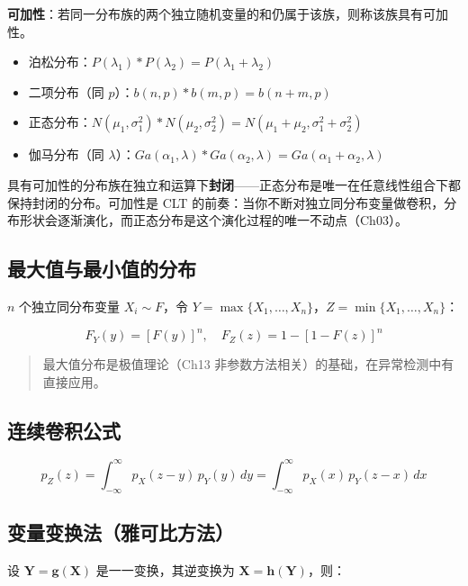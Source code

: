 \documentclass[
]{book}
\providecommand{\tightlist}{%
  \setlength{\itemsep}{0pt}\setlength{\parskip}{0pt}}
\begin{document}
\textbf{可加性}：若同一分布族的两个独立随机变量的和仍属于该族，则称该族具有可加性。

\begin{itemize}
\tightlist
\item
  泊松分布：\(P(\lambda_1) * P(\lambda_2) = P(\lambda_1 + \lambda_2)\)
\item
  二项分布（同 \(p\)）：\(b(n,p) * b(m,p) = b(n+m,p)\)
\item
  正态分布：\(N(\mu_1,\sigma_1^2) * N(\mu_2,\sigma_2^2) = N(\mu_1+\mu_2, \sigma_1^2+\sigma_2^2)\)
\item
  伽马分布（同 \(\lambda\)）：\(Ga(\alpha_1, \lambda) * Ga(\alpha_2, \lambda) = Ga(\alpha_1+\alpha_2, \lambda)\)
\end{itemize}

具有可加性的分布族在独立和运算下\textbf{封闭}------正态分布是唯一在任意线性组合下都保持封闭的分布。可加性是 CLT 的前奏：当你不断对独立同分布变量做卷积，分布形状会逐渐演化，而正态分布是这个演化过程的唯一不动点（Ch03）。

\subsection{最大值与最小值的分布}\label{ux6700ux5927ux503cux4e0eux6700ux5c0fux503cux7684ux5206ux5e03}

\(n\) 个独立同分布变量 \(X_i \sim F\)，令 \(Y = \max\{X_1, \ldots, X_n\}\)，\(Z = \min\{X_1, \ldots, X_n\}\)：

\[F_Y(y) = [F(y)]^n, \quad F_Z(z) = 1 - [1 - F(z)]^n\]

\begin{quote}
最大值分布是极值理论（Ch13 非参数方法相关）的基础，在异常检测中有直接应用。
\end{quote}

\subsection{连续卷积公式}\label{ux8fdeux7eedux5377ux79efux516cux5f0f}

\[p_Z(z) = \int_{-\infty}^{\infty} p_X(z-y) \, p_Y(y) \, dy = \int_{-\infty}^{\infty} p_X(x) \, p_Y(z-x) \, dx\]

\subsection{变量变换法（雅可比方法）}\label{ux53d8ux91cfux53d8ux6362ux6cd5ux96c5ux53efux6bd4ux65b9ux6cd5}

设 \(\mathbf{Y} = \mathbf{g}(\mathbf{X})\) 是一一变换，其逆变换为 \(\mathbf{X} = \mathbf{h}(\mathbf{Y})\)，则：
\end{document}
